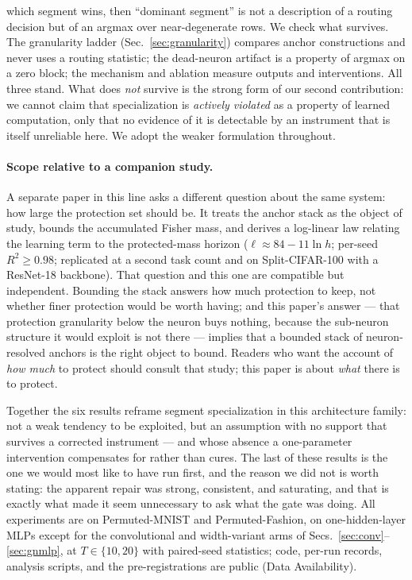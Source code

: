 \documentclass[review,12pt,number]{elsarticle}
\begin{document}
\begin{enumerate}
      which segment wins, then ``dominant segment'' is not a description
      of a routing decision but of an argmax over near-degenerate rows.
      We check what survives. The granularity ladder
      (Sec.~\ref{sec:granularity}) compares anchor constructions and never
      uses a routing statistic; the dead-neuron artifact is a property of
      argmax on a zero block; the mechanism and ablation measure outputs
      and interventions. All three stand. What does \emph{not} survive is
      the strong form of our second contribution: we cannot claim that
      specialization is \emph{actively violated} as a property of learned
      computation, only that no evidence of it is detectable by an
      instrument that is itself unreliable here. We adopt the weaker
      formulation throughout.
\end{enumerate}

\paragraph{Scope relative to a companion study.} A separate
paper in this line asks a different question about the same system: how
large the protection set should be. It treats the anchor stack as the
object of study, bounds the accumulated Fisher mass, and derives a
log-linear law relating the learning term to the protected-mass horizon
($\ell \approx 84 - 11\ln h$; per-seed $R^2 \ge 0.98$; replicated at a
second task count and on Split-CIFAR-100 with a ResNet-18 backbone).
That question and this one are compatible but independent. Bounding the
stack answers how much protection to keep, not whether finer protection
would be worth having; and this paper's answer --- that protection
granularity below the neuron buys nothing, because the sub-neuron
structure it would exploit is not there --- implies that a bounded stack
of neuron-resolved anchors is the right object to bound. Readers who
want the account of \emph{how much} to protect should consult that study;
this paper is about \emph{what} there is to protect.

Together the six results reframe segment specialization in this
architecture family: not a weak tendency to be exploited, but an
assumption with no support that survives a corrected instrument --- and
whose absence a one-parameter intervention compensates for rather than
cures. The last of these results is the one we would most like to have
run first, and the reason we did not is worth stating: the apparent
repair was strong, consistent, and saturating, and that is exactly what
made it seem unnecessary to ask what the gate was doing. All experiments are on
Permuted-MNIST and
Permuted-Fashion, on one-hidden-layer MLPs except for the convolutional and
width-variant arms of Secs.~\ref{sec:conv}--\ref{sec:gnmlp}, at $T\in\{10,20\}$
with paired-seed statistics; code,
per-run records, analysis scripts, and the pre-registrations are public
(Data Availability).
\end{document}
